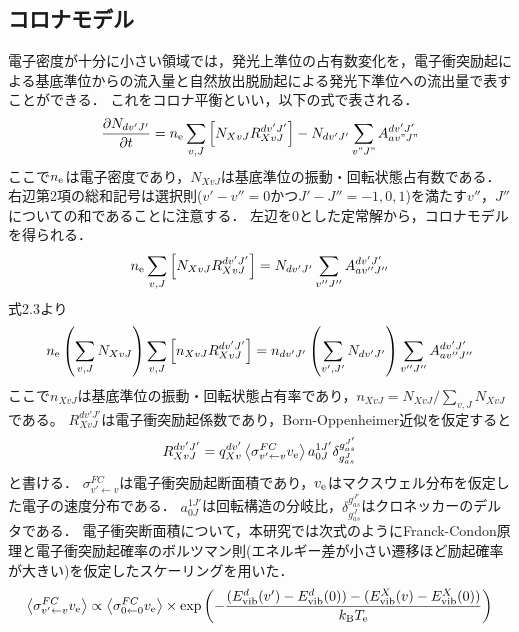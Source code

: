 \subsection{コロナモデル}
電子密度が十分に小さい領域では，発光上準位の占有数変化を，電子衝突励起による基底準位からの流入量と自然放出脱励起による発光下準位への流出量で表すことができる．
これをコロナ平衡といい，以下の式で表される\cite{PRnoijousei}．
\begin{equation}
    \frac{\partial N_{dv'J'}}{\partial t} = n_{\rm e} \sum_{v, J} \left[ N_{XvJ} R^{dv'J'}_{XvJ} \right] - N_{dv'J'} \sum_{v"J"} A^{dv'J'}_{av"J"}
\end{equation}
ここで$n_{\rm e}$は電子密度であり，$N_{XvJ}$は基底準位の振動・回転状態占有数である．
右辺第2項の総和記号は選択則($v'-v''=0$かつ$J'-J''=-1,0,1$)を満たす$v''，J''$についての和であることに注意する．
左辺を0とした定常解から，コロナモデルを得られる．
\begin{equation}
    n_{\rm e} \sum_{v, J} \left[ N_{XvJ} R^{dv'J'}_{XvJ} \right] = N_{dv'J'} \sum_{v''J''} A^{dv'J'}_{av''J''}
\end{equation}
式2.3より
\begin{equation}
    n_{\rm e} \left( \sum_{v, J} N_{XvJ} \right) \sum_{v, J} \left[ n_{XvJ} R^{dv'J'}_{XvJ} \right] = n_{dv'J'} \left( \sum_{v', J'} N_{dv'J'} \right) \sum_{v''J''} A^{dv'J'}_{av''J''}
\end{equation}
ここで$n_{XvJ}$は基底準位の振動・回転状態占有率であり，$n_{XvJ} = N_{XvJ} / \sum_{v,J} N_{XvJ}$である。
$R^{dv'J'}_{XvJ}$は電子衝突励起係数であり，Born-Oppenheimer近似を仮定すると
\begin{equation}
    R^{dv'J'}_{XvJ} = q^{dv'}_{Xv} \left< \sigma^{FC}_{v' \leftarrow v} v_{\rm e} \right> a^{1J'}_{0J} \delta^{g^{J'}_{as}}_{g^J_{as}}
\end{equation}
と書ける\cite{PRnoijousei}．
$\sigma^{FC}_{v' \leftarrow v}$は電子衝突励起断面積であり，$v_{\rm e}$はマクスウェル分布を仮定した電子の速度分布である．
$a^{1J'}_{0J}$は回転構造の分岐比，$\delta^{g^{J'}_{as}}_{g^J_{as}}$はクロネッカーのデルタである．
電子衝突断面積について，本研究では次式のようにFranck-Condon原理と電子衝突励起確率のボルツマン則(エネルギー差が小さい遷移ほど励起確率が大きい)を仮定したスケーリングを用いた\cite{kyokaisou}．
\begin{equation}
    \left< \sigma^{FC}_{v' \leftarrow v} v_{\rm e} \right> \propto \left< \sigma^{FC}_{0 \leftarrow 0} v_{\rm e} \right> \times \exp \left( -\frac{(E^d_{\rm vib} (v') - E^d_{\rm vib} (0))-(E^X_{\rm vib} (v) - E^X_{\rm vib} (0))}{k_{\rm B} T_{\rm e}} \right)
\end{equation}
